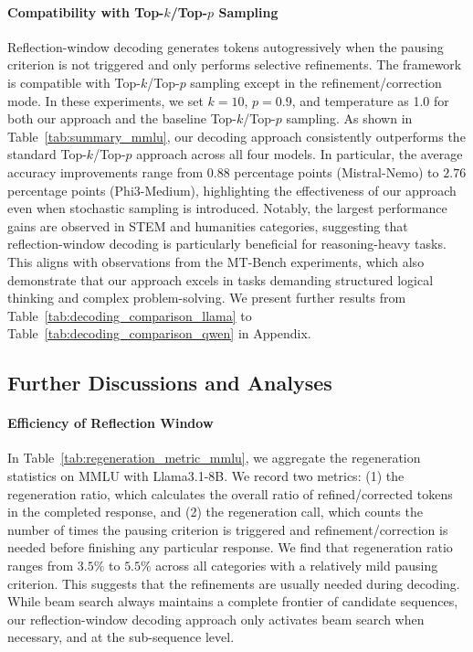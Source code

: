 \paragraph{Compatibility with Top-$k$/Top-$p$ Sampling}
Reflection-window decoding generates tokens autogressively when the pausing criterion is not triggered and only performs selective refinements.
The framework is compatible with Top-$k$/Top-$p$ sampling except in the refinement/correction mode.
In these experiments, we set $k=10$, $p=0.9$, and temperature as 1.0 for both our approach and the baseline Top-$k$/Top-$p$ sampling.
As shown in Table~\ref{tab:summary_mmlu}, our decoding approach consistently outperforms the standard Top-$k$/Top-$p$ approach across all four models.
In particular, the average accuracy improvements range from $0.88$ percentage points (Mistral-Nemo) to $2.76$ percentage points (Phi3-Medium), highlighting the effectiveness of our approach even when stochastic sampling is introduced.
Notably, the largest performance gains are observed in STEM and humanities categories, suggesting that reflection-window decoding is particularly beneficial for reasoning-heavy tasks.
This aligns with observations from the MT-Bench experiments, which also demonstrate that our approach excels in tasks demanding structured logical thinking and complex problem-solving.
We present further results from Table~\ref{tab:decoding_comparison_llama} to Table~\ref{tab:decoding_comparison_qwen} in Appendix.


\subsection{Further Discussions and Analyses}\label{main:experiments:discussions}
\paragraph{Efficiency of Reflection Window}
% 
In Table~\ref{tab:regeneration_metric_mmlu}, we aggregate the regeneration statistics on MMLU with Llama3.1-8B.
We record two metrics: (1) the regeneration ratio, which calculates the overall ratio of refined/corrected tokens in the completed response, and (2) the regeneration call, which counts the number of times the pausing criterion is triggered and refinement/correction is needed before finishing any particular response.
We find that regeneration ratio ranges from $3.5\%$ to $5.5\%$ across all categories with a relatively mild pausing criterion.
This suggests that the refinements are usually needed during decoding.
While beam search always maintains a complete frontier of candidate sequences, our reflection-window decoding approach only activates beam search when necessary, and at the sub-sequence level.

